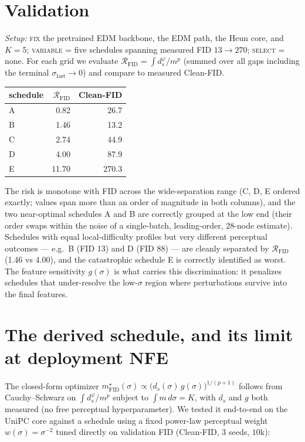 \documentclass[11pt]{article}
\begin{document}
\section{Validation}
\label{sec:validation}

\noindent\textit{Setup:} \textsc{fix} the pretrained EDM backbone, the EDM
path, the Heun core, and $K{=}5$; \textsc{variable} = five schedules
spanning measured FID $13\to270$; \textsc{select} = none. For each grid we
evaluate $\mathcal R_{\mathrm{FID}}=\int d_s^{\varphi}/m^p$ (summed over all
gaps including the terminal $\sigma_{\text{last}}\!\to\!0$) and compare to
measured Clean-FID.

\begin{center}
\small
\begin{tabular}{l r r}
\toprule
schedule & $\mathcal R_{\mathrm{FID}}$ & Clean-FID \\
\midrule
A & 0.82 & 26.7 \\
B & 1.46 & 13.2 \\
C & 2.74 & 44.9 \\
D & 4.00 & 87.9 \\
E & 11.70 & 270.3 \\
\bottomrule
\end{tabular}
\end{center}

\noindent The risk is monotone with FID across the wide-separation range
(C, D, E ordered exactly; values span more than an order of magnitude in
both columns), and the two near-optimal schedules A and B are correctly
grouped at the low end (their order swaps within the noise of a
single-batch, leading-order, $28$-node estimate). Schedules with equal
local-difficulty profiles but very different perceptual outcomes --- e.g.\
B (FID 13) and D (FID 88) --- are cleanly separated by
$\mathcal R_{\mathrm{FID}}$ (1.46 vs 4.00), and the catastrophic schedule
E is correctly identified as worst. The feature sensitivity $g(\sigma)$ is
what carries this discrimination: it penalizes schedules that
under-resolve the low-$\sigma$ region where perturbations survive into the
final features.

\section{The derived schedule, and its limit at deployment NFE}
\label{sec:schedule}

The closed-form optimizer
$m^{\star}_{\mathrm{FID}}(\sigma)\propto\bigl(d_s(\sigma)\,g(\sigma)\bigr)^{1/(p+1)}$
follows from Cauchy--Schwarz on $\int d_s^{\varphi}/m^p$ subject to
$\int m\,d\sigma=K$, with $d_s$ and $g$ both measured (no free perceptual
hyperparameter). We tested it end-to-end on the UniPC core against a
schedule using a fixed power-law perceptual weight $w(\sigma)=\sigma^{-2}$
tuned directly on validation FID (Clean-FID, 3 seeds, $10$k):
\end{document}
